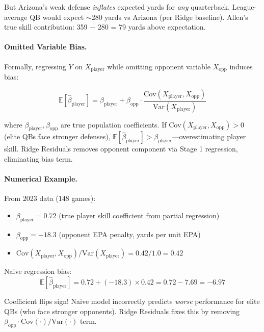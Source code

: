 But Arizona's weak defense \emph{inflates} expected yards for \emph{any} quarterback. League-average QB would expect $\sim$280 yards vs Arizona (per Ridge baseline). Allen's true skill contribution: 359 $-$ 280 = 79 yards above expectation.

\paragraph{Omitted Variable Bias.}
Formally, regressing $Y$ on $X_{\text{player}}$ while omitting opponent variable $X_{\text{opp}}$ induces bias:

\begin{equation}
\mathbb{E}[\hat{\beta}_{\text{player}}] = \beta_{\text{player}} + \beta_{\text{opp}} \cdot \frac{\text{Cov}(X_{\text{player}}, X_{\text{opp}})}{\text{Var}(X_{\text{player}})}
\label{eq:omitted-variable-bias}
\end{equation}

where $\beta_{\text{player}}, \beta_{\text{opp}}$ are true population coefficients. If $\text{Cov}(X_{\text{player}}, X_{\text{opp}}) > 0$ (elite QBs face stronger defenses), $\mathbb{E}[\hat{\beta}_{\text{player}}] > \beta_{\text{player}}$---overestimating player skill. Ridge Residuals removes opponent component via Stage 1 regression, eliminating bias term.

\paragraph{Numerical Example.}
From 2023 data (148 games):
\begin{itemize}[itemsep=2pt,parsep=0pt]
    \item $\beta_{\text{player}} = 0.72$ (true player skill coefficient from partial regression)
    \item $\beta_{\text{opp}} = -18.3$ (opponent EPA penalty, yards per unit EPA)
    \item $\text{Cov}(X_{\text{player}}, X_{\text{opp}}) / \text{Var}(X_{\text{player}}) = 0.42 / 1.0 = 0.42$
\end{itemize}

Naive regression bias:
\begin{equation}
\mathbb{E}[\hat{\beta}_{\text{player}}] = 0.72 + (-18.3) \times 0.42 = 0.72 - 7.69 = -6.97
\end{equation}

Coefficient flips sign! Naive model incorrectly predicts \emph{worse} performance for elite QBs (who face stronger opponents). Ridge Residuals fixes this by removing $\beta_{\text{opp}} \cdot \text{Cov}(\cdot) / \text{Var}(\cdot)$ term.

